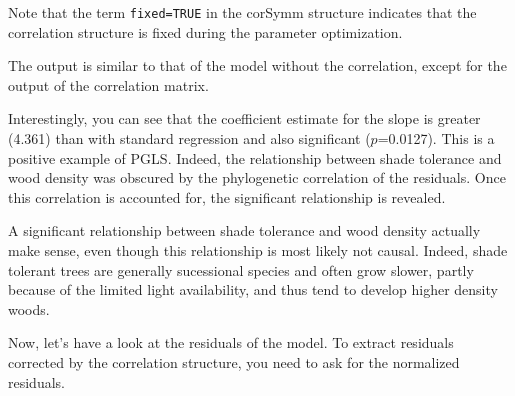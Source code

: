 \documentclass[
]{book}
\begin{document}
Note that the term \texttt{fixed=TRUE} in the corSymm structure indicates that the correlation structure is fixed during the parameter optimization.

The output is similar to that of the model without the correlation, except for the output of the correlation matrix.

Interestingly, you can see that the coefficient estimate for the slope is greater (4.361) than with standard regression and also significant (\(p\)=0.0127). This is a positive example of PGLS. Indeed, the relationship between shade tolerance and wood density was obscured by the phylogenetic correlation of the residuals. Once this correlation is accounted for, the significant relationship is revealed.

A significant relationship between shade tolerance and wood density actually make sense, even though this relationship is most likely not causal. Indeed, shade tolerant trees are generally sucessional species and often grow slower, partly because of the limited light availability, and thus tend to develop higher density woods.

Now, let's have a look at the residuals of the model. To extract residuals corrected by the correlation structure, you need to ask for the normalized residuals.
\end{document}
